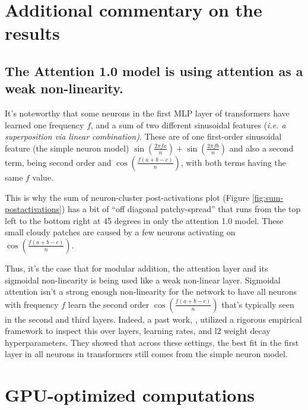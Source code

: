 \documentclass{article} %
\theoremstyle{plain}
\theoremstyle{definition}
\newtheorem{empirical fact}[theorem]{Empirical Fact}
\begin{document}
\section{Additional commentary on the results}

\subsection{The Attention 1.0 model is using attention as a weak non-linearity.}
It's noteworthy that some neurons in the first MLP layer of transformers have learned one frequency $f$, and a sum of two different sinusoidal features (\textit{i.e. a superposition via linear combination)}. These are of one first-order sinusoidal feature (the simple neuron model) $\sin(\frac{2\pi fa}{n}) + \sin(\frac{2\pi fb }{n})$ and also a second term, being second order and $\cos(\frac{f(a+b-c)}{n})$, with both terms having the same $f$ value.

This is why the sum of neuron-cluster post-activations plot (Figure \ref{fig:sum-postactivations}) has a bit of ``off diagonal patchy-spread'' that runs from the top left to the bottom right at 45 degrees in only the attention 1.0 model. These small cloudy patches are caused by a few neurons activating on $\cos(\frac{f(a+b-c)}{n})$. 

Thus, it's the case that for modular addition, the attention layer and its sigmoidal non-linearity is being used like a weak non-linear layer. Sigmoidal attention isn't a strong enough non-linearity for the network to have all neurons with frequency $f$ learn the second order $\cos(\frac{f(a+b-c)}{n})$ that's typically seen in the second and third layers. Indeed, a past work, \cite{mccracken2025uncoveringuniversalabstractalgorithm}, utilized a rigorous empirical framework to inspect this over layers, learning rates, and l2 weight decay hyperparameters. They showed that across these settings, the best fit in the first layer in all neurons in transformers still comes from the simple neuron model. 















\section{GPU-optimized computations}\label{app:gpu}
\end{document}
